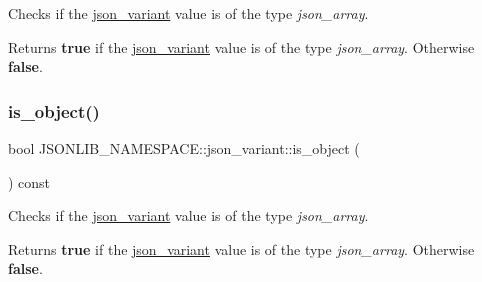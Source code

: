 Checks if the \hyperlink{classJSONLIB__NAMESPACE_1_1json__variant}{json\+\_\+variant} value is of the type {\itshape json\+\_\+array}. 

\begin{DoxyReturn}{Returns}
{\bfseries true} if the \hyperlink{classJSONLIB__NAMESPACE_1_1json__variant}{json\+\_\+variant} value is of the type {\itshape json\+\_\+array}. Otherwise {\bfseries false}. 
\end{DoxyReturn}
\mbox{\label{classJSONLIB__NAMESPACE_1_1json__variant_a28b4156626bd9f0e344ba1704c7590f3}} 
\subsubsection{\texorpdfstring{is\+\_\+object()}{is\_object()}\hspace{0.1cm}{\footnotesize\ttfamily [2/2]}}
{\footnotesize\ttfamily bool J\+S\+O\+N\+L\+I\+B\+\_\+\+N\+A\+M\+E\+S\+P\+A\+C\+E\+::json\+\_\+variant\+::is\+\_\+object (\begin{DoxyParamCaption}{ }\end{DoxyParamCaption}) const}



Checks if the \hyperlink{classJSONLIB__NAMESPACE_1_1json__variant}{json\+\_\+variant} value is of the type {\itshape json\+\_\+array}. 

\begin{DoxyReturn}{Returns}
{\bfseries true} if the \hyperlink{classJSONLIB__NAMESPACE_1_1json__variant}{json\+\_\+variant} value is of the type {\itshape json\+\_\+array}. Otherwise {\bfseries false}. 
\end{DoxyReturn}
\mbox{\label{classJSONLIB__NAMESPACE_1_1json__variant_ae097a22fe419dd083ff07bfebf0e8151}} 
